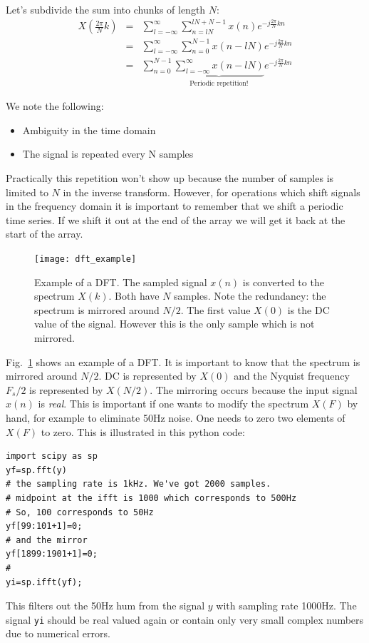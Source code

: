 \documentclass[12pt,a4paper]{article}
\begin{document}
Let's subdivide the sum into chunks of length $N$:
\begin{eqnarray}
X\left(\frac{2\pi}{N}k\right) 
& = &
\sum_{l = -\infty}^{\infty} \sum_{n=lN}^{lN+N-1} x(n)e^{-j \frac{2\pi}{N}kn} \\
& = & \sum_{l=-\infty}^{\infty} \sum_{n=0}^{N-1} x(n-lN) e^{-j \frac{2\pi}{N} kn} \\
& = & \sum_{n=0}^{N-1} \underbrace{\sum_{l=-\infty}^{\infty} x(n - lN)}_{\mbox{Periodic repetition!}} e^{-j \frac{2\pi}{N}kn}
\end{eqnarray}

We note the following:
\begin{itemize}
\item Ambiguity in the time domain
\item The signal is repeated every N samples
\end{itemize}
Practically this repetition won't show up because
the number of samples is limited to $N$ in the inverse transform.
However, for operations which shift signals in the frequency domain
it is important to remember that we shift a periodic time series. If
we shift it out at the end of the array we will get it back at the
start of the array.

\begin{figure}[!hbt]
\begin{center}
\mbox{\texttt{[image: dft\_example]}}
\end{center}
\caption{Example of a DFT. The sampled signal $x(n)$ is
converted to the spectrum $X(k)$. Both have $N$ samples.
Note the redundancy: the spectrum is mirrored around $N/2$.
The first value $X(0)$ is the DC value of the signal. However
this is the only sample which is not mirrored.
\label{dft_example}}
\end{figure}
Fig.~\ref{dft_example} shows an example of a DFT. It is important
to know that the spectrum is mirrored around $N/2$. DC is represented
by $X(0)$ and the Nyquist frequency $F_s/2$ is represented by
$X(N/2)$. The mirroring occurs because the input signal $x(n)$
is \textsl{real}. This is important if one wants to modify the
spectrum $X(F)$ by hand, for example to eliminate 50Hz noise. One
needs to zero two elements of $X(F)$ to zero. This is illustrated
in this python code:
\begin{verbatim}
import scipy as sp
yf=sp.fft(y)
# the sampling rate is 1kHz. We've got 2000 samples.
# midpoint at the ifft is 1000 which corresponds to 500Hz
# So, 100 corresponds to 50Hz
yf[99:101+1]=0;
# and the mirror
yf[1899:1901+1]=0;
#
yi=sp.ifft(yf);
\end{verbatim}
This filters out the 50Hz hum from the signal $y$ with sampling rate
1000Hz. The signal \texttt{yi} should be real valued again or contain
only very small complex numbers due to numerical errors.
\end{document}
